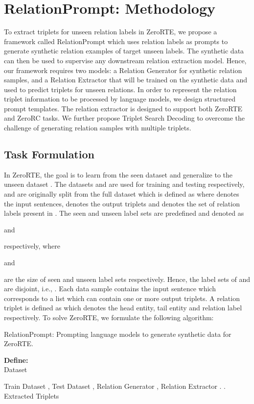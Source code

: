 \documentclass[11pt]{article}
\newcommand{\flag}[1]{#1}
\begin{document}
\section{RelationPrompt: Methodology}
To extract triplets for unseen relation labels in ZeroRTE, we propose a framework called RelationPrompt which uses relation labels as prompts to generate synthetic relation examples of target unseen labels.
The synthetic data can then be used to supervise any downstream relation extraction model.
Hence, our framework requires two models: a Relation Generator for synthetic relation samples, and a Relation Extractor that will be trained on the synthetic data and used to predict triplets for unseen relations.
In order to represent the relation triplet information to be processed by language models, we design structured prompt templates.
The relation extractor is designed to support both ZeroRTE and ZeroRC tasks.
We further propose Triplet Search Decoding to overcome the challenge of generating relation samples with multiple triplets.




\subsection{Task Formulation}
\flag{
In ZeroRTE, the goal is to learn from the seen dataset  and generalize to the unseen dataset .
The datasets  and  are used for training and testing respectively, and are originally split from the full dataset which is defined as  where  denotes the input sentences,  denotes the output triplets and  denotes the set of relation labels present in . 
The seen and unseen label sets are predefined and denoted as 

and

respectively, where 

and

are the size of seen and unseen label sets respectively.
Hence, the label sets of  and  are disjoint, i.e., .
Each data sample contains the input sentence  which corresponds to a list  which can contain one or more output triplets.
A relation triplet is defined as 
 which denotes the head entity, tail entity and relation label respectively.
To solve ZeroRTE, we formulate the following algorithm:
}


\begin{algorithm}
\caption{RelationPrompt: Prompting language models to generate synthetic data for ZeroRTE.}
\label{alg:cap}
\textbf{Define:} \\
Dataset 
\begin{algorithmic}[1]
\Require
Train Dataset ,
Test Dataset ,
Relation Generator , 
Relation Extractor .
\Ensure .
\State 
\State 
\State 
\State 
\State 
\\ \Return Extracted Triplets 
\end{algorithmic}
\end{algorithm}
\end{document}
